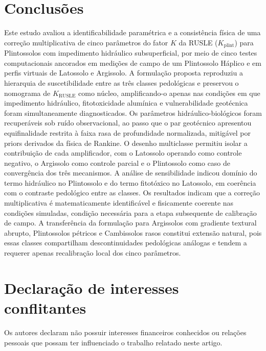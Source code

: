 \documentclass[preprint,review,12pt,authoryear]{elsarticle}
\begin{document}
\section{Conclusões}
\label{sec:conclusions}

Este estudo avaliou a identificabilidade paramétrica e a consistência física de uma correção multiplicativa de cinco parâmetros do fator $K$ da RUSLE ($K_{\mathrm{plint}}$) para Plintossolos com impedimento hidráulico subsuperficial, por meio de cinco testes computacionais ancorados em medições de campo de um Plintossolo Háplico e em perfis virtuais de Latossolo e Argissolo. A formulação proposta reproduziu a hierarquia de suscetibilidade entre as três classes pedológicas e preservou o nomograma de $K_{\mathrm{RUSLE}}$ como núcleo, amplificando-o apenas nas condições em que impedimento hidráulico, fitotoxicidade alumínica e vulnerabilidade geotécnica foram simultaneamente diagnosticados. Os parâmetros hidráulico-biológicos foram recuperáveis sob ruído observacional, ao passo que o par geotécnico apresentou equifinalidade restrita à faixa rasa de profundidade normalizada, mitigável por priors derivados da física de Rankine. O desenho multiclasse permitiu isolar a contribuição de cada amplificador, com o Latossolo operando como controle negativo, o Argissolo como controle parcial e o Plintossolo como caso de convergência dos três mecanismos. A análise de sensibilidade indicou domínio do termo hidráulico no Plintossolo e do termo fitotóxico no Latossolo, em coerência com o contraste pedológico entre as classes. Os resultados indicam que a correção multiplicativa é matematicamente identificável e fisicamente coerente nas condições simuladas, condição necessária para a etapa subsequente de calibração de campo. A transferência da formulação para Argissolos com gradiente textural abrupto, Plintossolos pétricos e Cambissolos rasos constitui extensão natural, pois essas classes compartilham descontinuidades pedológicas análogas e tendem a requerer apenas recalibração local dos cinco parâmetros.

\section*{Declaração de interesses conflitantes}

Os autores declaram não possuir interesses financeiros conhecidos ou relações pessoais que possam ter influenciado o trabalho relatado neste artigo.
\end{document}
